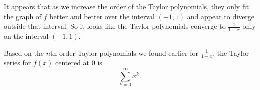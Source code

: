 \begin{activitySolution}
It appears that as we increase the order of the Taylor polynomials, they only fit the graph of $f$ better and better over the interval $(-1,1)$ and appear to diverge outside that interval. So it looks like the Taylor polynomials converge to $\frac{1}{1-x}$ only on the interval $(-1,1)$.

Based on the $n$th order Taylor polynomials we found earlier for $\frac{1}{1-x}$, the Taylor series for $f(x)$ centered at 0 is
\[\sum_{k=0}^{\infty} x^k.\]
\ea
\end{activitySolution}
\aftera 